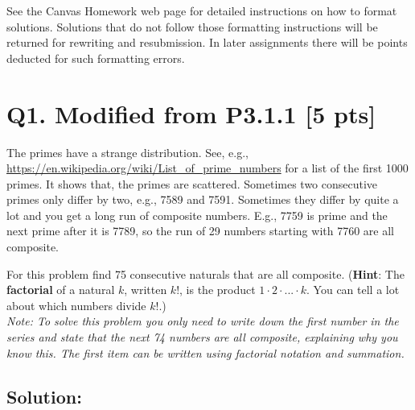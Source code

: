 \documentclass[12pt]{article}
\begin{document}



\bigskip


See the Canvas Homework web page for detailed instructions on how to format solutions.  Solutions that do not follow those formatting instructions  will be returned for rewriting and resubmission. In later assignments there will be points deducted for such formatting errors.  
 
\newpage

\section*{\textbf{Q1. Modified from  P3.1.1} [5 pts]}

The primes have a strange distribution.  See, e.g.,  
\url{https://en.wikipedia.org/wiki/List_of_prime_numbers}  
for a list of the first 1000 primes. It shows that, the primes are scattered.  Sometimes two consecutive primes only  differ by two, e.g., 7589 and 7591. Sometimes they differ by quite a lot and you get a long run of composite numbers.  E.g., 7759 is prime and the next prime after it is 7789, so the run of 29 numbers starting with 7760 are all composite.

For this problem 
 find 75  consecutive naturals that are all composite. (\textbf{Hint}: The \textbf{factorial} of a natural $k$, written $k!$, is the product $1 \cdot 2 \cdot . . . \cdot k$. You can tell a lot about which numbers divide $k!$.) \\

\textit{Note:  To solve this problem you only need to write down the first number in the series and state that the next 74 numbers are all composite, explaining why you know this. The first item can be written using factorial notation and summation.}

\subsection*{\textbf{Solution:}}
\end{document}
